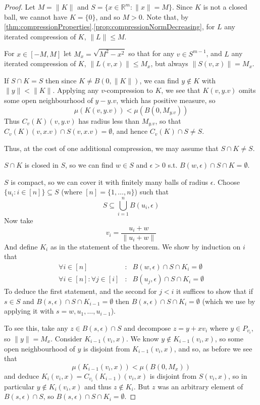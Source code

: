 \documentclass[a4paper,11pt]{article}
\newcommand{\bbR}{\mathbb{R}}
\newcommand{\lV}{\lVert}
\newcommand{\rV}{\rVert}
\begin{document}
\begin{proof}
Let $M=\lV K\rV$ and $S=\{x\in\bbR^m:\lV x\rV=M\}$.  Since $K$ is not a closed
ball, we cannot have $K=\{0\}$, and so $M>0$.  Note that, by
\ref{thm:compressionProperties}.\ref{prop:compressionNormDecreasing},
for $L$ any iterated compression of $K$, $\lV L\rV\leq M$.

For $x\in[-M,M]$ let $M_x=\sqrt{M^2-x^2}$ so
that for any $v\in S^{m-1}$, and $L$ any iterated
compression of $K$, $\lV L(v,x)\rV\leq M_x$, but always $\lV S(v,x)\rV=M_x$.

If $S\cap K=S$ then since
$K\not=B(0,\lV K\rV)$, we can find $y\not\in K$ with $\lV y\rV<\lV K\rV$.
Applying any $v$-compression to $K$, we see that $K(v,y.v)$ omits some open
neighbourhood of $y-y.v$, which has positive measure, so
\[
\mu(K(v,y.v))<\mu(B(0,M_{y.v}))
\]
Thus $C_v(K)(v,y.v)$ has radius less than $M_{y.v}$,
so that $C_v(K)(v,x.v)\cap S(v,x.v)=\emptyset$, and hence
$C_v(K)\cap S\not=S$.

Thus, at the cost of one additional compression, we may assume that
$S\cap K\not=S$.

$S\cap K$ is closed in $S$, so we can find $w\in S$ and $\epsilon>0$ s.t.
$B(w,\epsilon)\cap S\cap K=\emptyset$.

$S$ is compact, so we can cover it with finitely many balls of radius
$\epsilon$.  Choose $\{u_i:i\in[n]\}\subseteq S$ (where $[n]=\{1,\ldots,n\}$)
such that
\[
S\subseteq\bigcup_{i=1}^n B(u_i,\epsilon)
\]
Now take
\[
v_i=\frac{u_i+w}{\lV u_i+w\rV}
\]
And define $K_i$ as in the statement of the theorem.
We show by induction on $i$
that
%
\begin{eqnarray*}
\forall i\in[n] &:& B(w,\epsilon)\cap S\cap K_i=\emptyset \\
\forall i\in[n]:\forall j\in[i] &:& B(u_j,\epsilon)\cap S\cap K_i=\emptyset
\end{eqnarray*}
%
To deduce the first statement, and the second for $j<i$ it suffices to show
that if $s\in S$ and $B(s,\epsilon)\cap S\cap K_{i-1}=\emptyset$ then
$B(s,\epsilon)\cap S\cap K_i=\emptyset$ (which we use by applying it with
$s=w,u_1,\ldots,u_{i-1}$).

To see this, take any $z\in B(s,\epsilon)\cap S$ and decompose $z=y+xv_i$ where
$y\in P_{v_i}$, so $\lV y\rV=M_x$.  Consider $K_{i-1}(v_i,x)$.
We know $y\not\in K_{i-1}(v_i,x)$, so
some open neighbourhood of $y$ is disjoint from $K_{i-1}(v_i,x)$, and so, as
before we see that
\[
\mu(K_{i-1}(v_i,x))<\mu(B(0,M_x))
\]
and deduce $K_{i}(v_i,x)=C_{v_i}(K_{i-1})(v_i,x)$ is disjoint from $S(v_i,x)$,
so in particular $y\not\in K_{i}(v_i,x)$ and thus $z\not\in K_{i}$.  But $z$
was an arbitrary element of $B(s,\epsilon)\cap S$, so
$B(s,\epsilon)\cap S\cap K_{i}=\emptyset$.


\end{proof}
\end{document}
